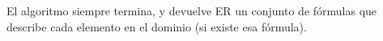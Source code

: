 









El algoritmo siempre termina, y devuelve ER un conjunto de f\'ormulas que describe cada elemento en el dominio (si existe esa f\'ormula). \\

